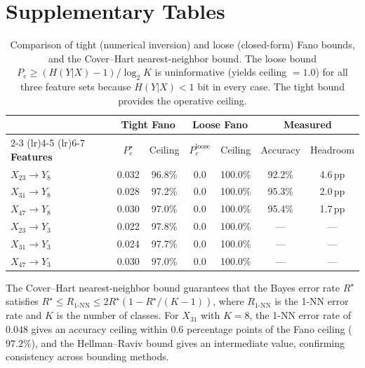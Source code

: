 \documentclass[11pt,a4paper]{article}
\renewcommand{\_}{\oldunderscore\allowbreak}
\begin{document}
\clearpage
\setcounter{table}{0}
\section*{Supplementary Tables}


\begin{table}[h]
\centering
\caption{Comparison of tight (numerical inversion) and loose
(closed-form) Fano bounds, and the Cover--Hart nearest-neighbor bound.
The loose bound $P_e \geq (H(Y|X) - 1)/\log_2 K$ is uninformative
(yields ceiling $= 1.0$) for all three feature sets because
$H(Y|X) < 1$ bit in every case. The tight bound provides the
operative ceiling.}
\label{tab:s1}
\begin{tabular}{lcccccc}
\toprule
& \multicolumn{2}{c}{\textbf{Tight Fano}} & \multicolumn{2}{c}{\textbf{Loose Fano}} & \multicolumn{2}{c}{\textbf{Measured}} \\
\cmidrule(lr){2-3} \cmidrule(lr){4-5} \cmidrule(lr){6-7}
\textbf{Features} & $P_e^\star$ & Ceiling & $P_e^{\text{loose}}$ & Ceiling & Accuracy & Headroom \\
\midrule
$X_{23} \to Y_8$
  & 0.032 & 96.8\% & 0.0 & 100.0\% & 92.2\% & 4.6\,pp \\
$X_{31} \to Y_8$
  & 0.028 & 97.2\% & 0.0 & 100.0\% & 95.3\% & 2.0\,pp \\
$X_{47} \to Y_8$
  & 0.030 & 97.0\% & 0.0 & 100.0\% & 95.4\% & 1.7\,pp \\
\midrule
$X_{23} \to Y_3$
  & 0.022 & 97.8\% & 0.0 & 100.0\% & --- & --- \\
$X_{31} \to Y_3$
  & 0.024 & 97.7\% & 0.0 & 100.0\% & --- & --- \\
$X_{47} \to Y_3$
  & 0.030 & 97.0\% & 0.0 & 100.0\% & --- & --- \\
\bottomrule
\end{tabular}
\end{table}

\smallskip
\noindent
The Cover--Hart nearest-neighbor bound guarantees that the
Bayes error rate $R^\star$ satisfies
$R^\star \leq R_{1\text{-NN}} \leq 2 R^\star (1 - R^\star / (K-1))$,
where $R_{1\text{-NN}}$ is the 1-NN error rate and $K$ is the number
of classes. For $X_{31}$ with $K = 8$, the 1-NN error rate of
$0.048$ gives an accuracy ceiling within 0.6 percentage points of
the Fano ceiling ($97.2\%$), and the Hellman--Raviv bound gives an
intermediate value, confirming consistency across bounding methods.
\end{document}
